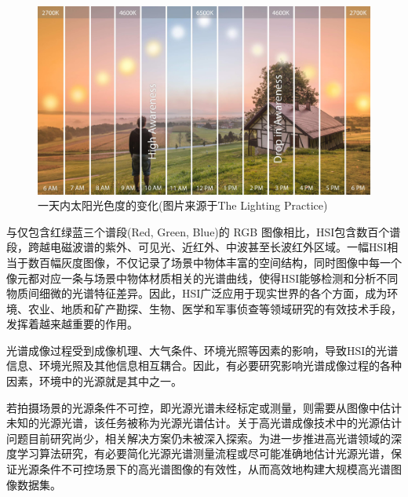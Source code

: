 \documentclass[
    type = master, %
    degree = academic,        %
    decl-page,  %
  ]{njuthesis}
\begin{document}
\begin{figure}[h]
	\begin{center}
		\includegraphics[width=0.8\linewidth]{docs/fig-chap1/fig-1-sunlight.pdf}
	\end{center}
	\caption{一天内太阳光色度的变化(图片来源于The Lighting Practice)}
	\label{fig:sunlight}
\end{figure}

与仅包含红绿蓝三个谱段(Red, Green, Blue)的 RGB 图像相比，HSI包含数百个谱段，跨越电磁波谱的紫外、可见光、近红外、中波甚至长波红外区域。一幅HSI相当于数百幅灰度图像，不仅记录了场景中物体丰富的空间结构，同时图像中每一个像元都对应一条与场景中物体材质相关的光谱曲线，使得HSI能够检测和分析不同物质间细微的光谱特征差异。因此，HSI广泛应用于现实世界的各个方面，成为环境、农业、地质和矿产勘探、生物、医学和军事侦查等\cite{teke2013short-app,lu2014medical-app,adao2017hyperspectral-app,khan2018modern-app,lu2020recent-app}领域研究的有效技术手段，发挥着越来越重要的作用。

光谱成像过程受到成像机理、大气条件、环境光照等因素的影响，导致HSI的光谱信息、环境光照及其他信息相互耦合\cite{李树涛2023高光谱遥感图像本征信息分解前沿与挑战}。因此，有必要研究影响光谱成像过程的各种因素，环境中的光源就是其中之一。

若拍摄场景的光源条件不可控，即光源光谱未经标定或测量，则需要从图像中估计未知的光源光谱，该任务被称为光源光谱估计。关于高光谱成像技术中的光源估计问题目前研究尚少，相关解决方案仍未被深入探索\cite{鲁洋2022基于单幅多光谱图像的照明光谱估计方法}。为进一步推进高光谱领域的深度学习算法研究，有必要简化光源光谱测量流程或尽可能准确地估计光源光谱，保证光源条件不可控场景下的高光谱图像的有效性，从而高效地构建大规模高光谱图像数据集。
\end{document}
